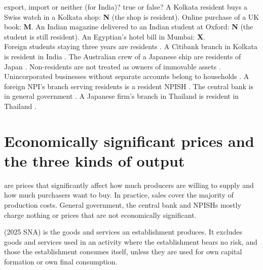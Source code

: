 \begin{quick}{export, import or neither (for India)? true or false?}
\small A Kolkata resident buys a Swiss watch in a Kolkata shop: \textbf{N} (the shop is
resident). Online purchase of a UK book: \textbf{M}. An Indian magazine delivered to an Indian
student at Oxford: \textbf{N} (the student is still resident). An Egyptian's hotel bill in
Mumbai: \textbf{X}.\\
Foreign students staying three years are residents \no. A Citibank branch in Kolkata is resident
in India \yes. The Australian crew of a Japanese ship are residents of Japan \no. Non-residents
are not treated as owners of immovable assets \yes. Unincorporated businesses without separate
accounts belong to households \yes. A foreign NPI's branch serving residents is a resident NPISH
\yes. The central bank is in general government \no. A Japanese firm's branch in Thailand is
resident in Thailand \yes.
\end{quick}

\section{Economically significant prices and the three kinds of output}\label{sec:output}

 are prices that significantly affect how much producers are
willing to supply and how much purchasers want to buy. In practice, sales cover the majority of
production costs. General government, the central bank and NPISHs mostly charge nothing or prices
that are not economically significant.

 (2025 SNA) is the goods and services an establishment produces. It excludes goods and
services used in an activity where the establishment bears no risk, and those the establishment
consumes itself, unless they are used for own capital formation or own final consumption.

